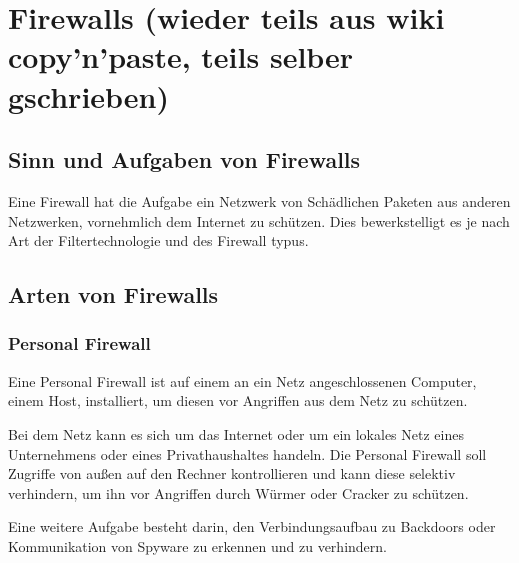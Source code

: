 \chapter{Firewalls (wieder teils aus wiki copy'n'paste, teils selber gschrieben)}
\section{Sinn und Aufgaben von Firewalls}
Eine Firewall hat die Aufgabe ein Netzwerk von Schädlichen Paketen aus anderen Netzwerken, vornehmlich dem Internet zu schützen. Dies bewerkstelligt es je nach Art der Filtertechnologie und des Firewall typus.
\section{Arten von Firewalls}
\subsection{Personal Firewall}
Eine Personal Firewall ist auf einem an ein Netz angeschlossenen Computer, einem Host, installiert, um diesen vor Angriffen aus dem Netz zu schützen.

Bei dem Netz kann es sich um das Internet oder um ein lokales Netz eines Unternehmens oder eines Privathaushaltes handeln. Die Personal Firewall soll Zugriffe von außen auf den Rechner kontrollieren und kann diese selektiv verhindern, um ihn vor Angriffen durch Würmer oder Cracker zu schützen.

Eine weitere Aufgabe besteht darin, den Verbindungsaufbau zu Backdoors oder Kommunikation von Spyware zu erkennen und zu verhindern.